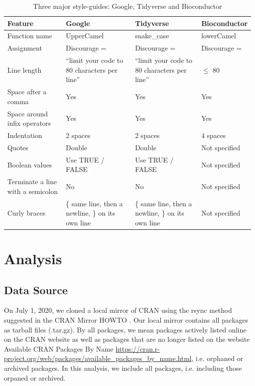 \begin{table}

\caption{\label{tab:table1}Three major style-guides: Google, Tidyverse and Bioconductor}
\centering
\begin{tabular}[t]{L|L|L|L}
\hline
Feature & Google & Tidyverse & Bioconductor\\
\hline
Function name & UpperCamel & snake\_case & lowerCamel\\
\hline
Assignment & Discourage = & Discourage = & Discourage =\\
\hline
Line length & “limit your code to 80 characters per line” & “limit your code to 80 characters per line” & $\leqslant$ 80\\
\hline
Space after a comma & Yes & Yes & Yes\\
\hline
Space around infix operators & Yes & Yes & Yes\\
\hline
Indentation & 2 spaces & 2 spaces & 4 spaces\\
\hline
Quotes & Double & Double & Not specified\\
\hline
Boolean values & Use TRUE / FALSE & Use TRUE / FALSE & Not specified\\
\hline
Terminate a line with a semicolon & No & No & Not specified\\
\hline
Curly braces & \{ same line, then a newline, \} on its own line & \{ same line, then a newline, \} on its own line & Not specified\\
\hline
\end{tabular}
\end{table}


\section{Analysis}
\subsection{Data Source}

On July 1, 2020, we cloned a local mirror of CRAN using the rsync method suggested in the CRAN Mirror HOWTO \citep{cranminihowto}. Our local mirror contains all packages as tarball files (.tar.gz). By all packages, we mean packages actively listed online on the CRAN website as well as packages that are no longer listed on the website Available CRAN Packages By Name \url{https://cran.r-project.org/web/packages/available_packages_by_name.html}, i.e. orphaned or archived packages. In this analysis, we include all packages, i.e. including those orpaned or archived.

